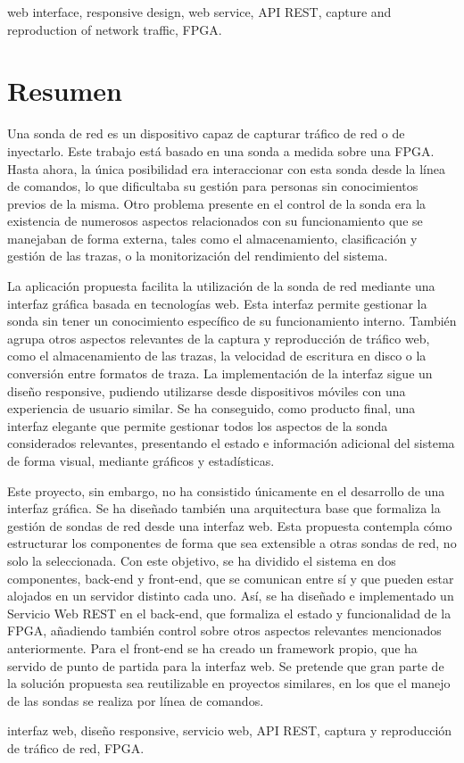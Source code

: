 \begin{keywordsEn}
web interface, responsive design, web service, API REST, capture and reproduction of network traffic, FPGA.
\end{keywordsEn}

\chapter*{Resumen}

\begin{abstractEs}

Una sonda de red es un dispositivo capaz de capturar tráfico de red o de inyectarlo.
Este trabajo está basado en una sonda a medida sobre una FPGA.
Hasta ahora, la única posibilidad era interaccionar con esta sonda desde la línea de comandos, lo que dificultaba su gestión para personas sin conocimientos previos de la misma.
Otro problema presente en el control de la sonda era la existencia de numerosos aspectos relacionados con su funcionamiento que se manejaban de forma externa, tales como el almacenamiento, clasificación y gestión de las trazas, o la monitorización del rendimiento del sistema.

La aplicación propuesta facilita la utilización de la sonda de red mediante una interfaz gráfica basada en tecnologías web.
Esta interfaz permite gestionar la sonda sin tener un conocimiento específico de su funcionamiento interno.
También agrupa otros aspectos relevantes de la captura y reproducción de tráfico web, como el almacenamiento de las trazas, la velocidad de escritura en disco o la conversión entre formatos de traza.
La implementación de la interfaz sigue un diseño responsive, pudiendo utilizarse desde dispositivos móviles con una experiencia de usuario similar.
Se ha conseguido, como producto final, una interfaz elegante que permite gestionar todos los aspectos de la sonda considerados relevantes, presentando el estado e información adicional del sistema de forma visual, mediante gráficos y estadísticas.

Este proyecto, sin embargo, no ha consistido únicamente en el desarrollo de una interfaz gráfica.
Se ha diseñado también una arquitectura base que formaliza la gestión de sondas de red desde una interfaz web.
Esta propuesta contempla cómo estructurar los componentes de forma que sea extensible a otras sondas de red, no solo la seleccionada.
Con este objetivo, se ha dividido el sistema en dos componentes, back-end y front-end, que se comunican entre sí y que pueden estar alojados en un servidor distinto cada uno.
Así, se ha diseñado e implementado un Servicio Web REST en el back-end, que formaliza el estado y funcionalidad de la FPGA, añadiendo también control sobre otros aspectos relevantes mencionados anteriormente.
Para el front-end se ha creado un framework propio, que ha servido de punto de partida para la interfaz web.
Se pretende que gran parte de la solución propuesta sea reutilizable en proyectos similares, en los que el manejo de las sondas se realiza por línea de comandos.

\end{abstractEs}

\begin{keywordsEs}
interfaz web, diseño responsive, servicio web, API REST, captura y reproducción de tráfico de red, FPGA.
\end{keywordsEs}
